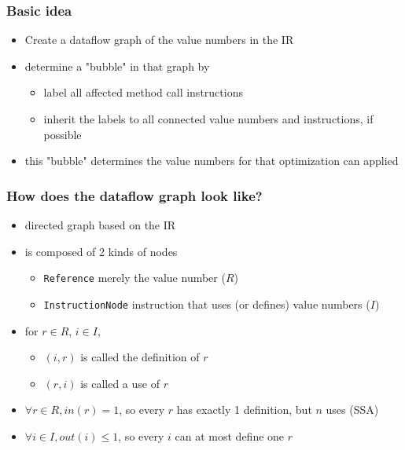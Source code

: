 \documentclass{beamer}
\begin{document}
\begin{frame}
  \frametitle{Basic idea}
  \begin{itemize}
      \item Create a dataflow graph of the value numbers in the IR
      \item determine a "bubble" in that graph by
      \begin{itemize}
        \item label all affected method call instructions
        \item inherit the labels to all connected value numbers and instructions, if possible
      \end{itemize}
      \item this "bubble" determines the value numbers for that optimization can applied
      
  \end{itemize}
\end{frame}

\begin{frame}
  \frametitle{How does the dataflow graph look like?}
  \begin{itemize}
    \item directed graph based on the IR
    \item is composed of 2 kinds of nodes
      \begin{itemize}
        \item \texttt{Reference} merely the value number ($R$)
        \item \texttt{InstructionNode} instruction that uses (or defines) value numbers ($I$)
      \end{itemize}
    \item for $r\in R$, $i \in I$, 
    \begin{itemize}
      \item $(i,r)$ is called the definition of $r$     
      \item $(r,i)$ is called a use of $r$
    \end{itemize}
    \item $\forall r \in R, in(r) = 1$, so every $r$ has exactly 1 definition, but $n$ uses (SSA)
    \item $\forall i \in I, out(i) \leq 1$, so every $i$ can at most define one $r$
  \end{itemize}
\end{frame}
\end{document}
